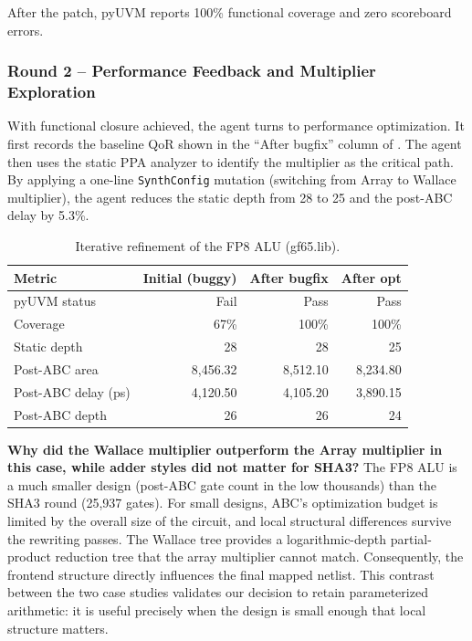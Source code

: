 \documentclass[11pt]{article}
\begin{document}
After the patch, pyUVM reports 100\% functional coverage and zero scoreboard errors.

\subsubsection{Round 2 -- Performance Feedback and Multiplier Exploration}

With functional closure achieved, the agent turns to performance optimization. It first records the baseline QoR shown in the ``After bugfix'' column of . The agent then uses the static PPA analyzer to identify the multiplier as the critical path. By applying a one-line \texttt{SynthConfig} mutation (switching from Array to Wallace multiplier), the agent reduces the static depth from 28 to 25 and the post-ABC delay by 5.3\%.

\begin{table}[htbp]
\centering
\caption{Iterative refinement of the FP8 ALU (gf65.lib).}
\label{tab:fp8_qor}
\begin{tabular}{@{}lrrr@{}}
\toprule
\textbf{Metric} & \textbf{Initial (buggy)} & \textbf{After bugfix} & \textbf{After opt} \\
\midrule
pyUVM status & Fail & Pass & Pass \\
Coverage & 67\% & 100\% & 100\% \\
Static depth & 28 & 28 & 25 \\
Post-ABC area & 8,456.32 & 8,512.10 & 8,234.80 \\
Post-ABC delay (ps) & 4,120.50 & 4,105.20 & 3,890.15 \\
Post-ABC depth & 26 & 26 & 24 \\
\bottomrule
\end{tabular}
\end{table}

\textbf{Why did the Wallace multiplier outperform the Array multiplier in this case, while adder styles did not matter for SHA3?} The FP8 ALU is a much smaller design (post-ABC gate count in the low thousands) than the SHA3 round (25,937 gates). For small designs, ABC's optimization budget is limited by the overall size of the circuit, and local structural differences survive the rewriting passes. The Wallace tree provides a logarithmic-depth partial-product reduction tree that the array multiplier cannot match. Consequently, the frontend structure directly influences the final mapped netlist. This contrast between the two case studies validates our decision to retain parameterized arithmetic: it is useful precisely when the design is small enough that local structure matters.
\end{document}
